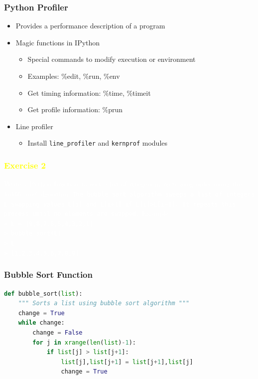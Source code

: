 \documentclass[xcolor=table,10pt,final]{beamer}
\begin{document}
\begin{frame}
	\frametitle{Python Profiler}
	\begin{itemize}
		\item Provides a performance description of a program
		\item Magic functions in IPython
		\begin{itemize}
			\item Special commands to modify execution or environment
			\item Examples: \%edit, \%run, \%env
			\item Get timing information: \%time, \%timeit 
			\item Get profile information: \%prun 
		\end{itemize}
		\item Line profiler
		\begin{itemize}
			\item Install {\tt line\_profiler} and {\tt kernprof} modules
		\end{itemize}
	\end{itemize}
\end{frame}

{
\begin{frame}
	\frametitle{\textcolor{yellow}{Exercise 2}}
	\textcolor{white}{Write a Python function to sort a list of integers in increasing order using the \emph{bubble sort} algorithm.\newline\newline
	{\tt The bubble sort algorithm sweeps a list of integers L swapping values L[i] and L[i+1] if L[i]>L[i+1]. It repeats this process until no elements are swapped.}\newline\newline
	Example: \\ {\tt > L = [9,8,7,6,5,4,3,2,1] }\\ {\tt > bubble\_sort(L)} \\ {\tt > L}\\ {\tt > [1,2,3,4,5,6,7,8,9]}
	}
\end{frame}
}

\begin{frame}[fragile]
	\frametitle{Bubble Sort Function}
	\begin{lstlisting}[language=Python]
def bubble_sort(list):
    """ Sorts a list using bubble sort algorithm """
    change = True
    while change:
        change = False
        for j in xrange(len(list)-1):
            if list[j] > list[j+1]:
                list[j],list[j+1] = list[j+1],list[j]
                change = True
	\end{lstlisting}
\end{frame}
\end{document}
